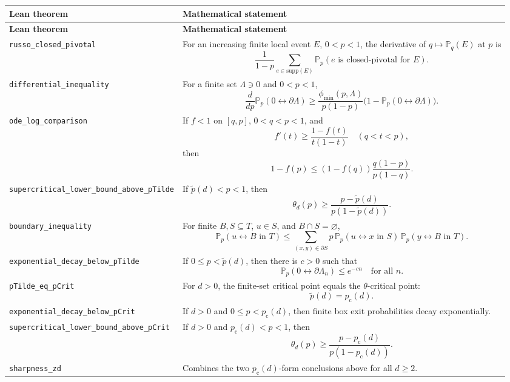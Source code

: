 \documentclass[10pt]{article}
\newcommand{\module}[1]{\texttt{#1}}
\newcommand{\pc}{p_{\mathrm{c}}}
\newcommand{\pt}{\widetilde p}
\newcommand{\prob}{\mathbb P}
\begin{document}
\begin{longtable}{>{\raggedright\arraybackslash}p{} >{\raggedright\arraybackslash}p{}}
\textbf{Lean theorem} & \textbf{Mathematical statement} \\
\hline
\endfirsthead
\textbf{Lean theorem} & \textbf{Mathematical statement} \\
\hline
\endhead
\module{russo\_closed\_pivotal} &
For an increasing finite local event \(E\), \(0<p<1\), the derivative of \(q\mapsto\prob_q(E)\) at \(p\) is
\[
  \frac{1}{1-p}\sum_{e\in\mathrm{supp}(E)}
  \prob_p(e\text{ is closed-pivotal for }E).
\] \\
\module{differential\_inequality} &
For a finite set \(\Lambda\ni0\) and \(0<p<1\),
\[
\frac{d}{dp}\prob_p(0\leftrightarrow \partial\Lambda)
\ge
\frac{\phi_{\min}(p,\Lambda)}{p(1-p)}
\bigl(1-\prob_p(0\leftrightarrow \partial\Lambda)\bigr).
\] \\
\module{ode\_log\_comparison} &
If \(f<1\) on \([q,p]\), \(0<q<p<1\), and
\[
f'(t)\ge \frac{1-f(t)}{t(1-t)}\quad(q<t<p),
\]
then
\[
1-f(p)\le (1-f(q))\frac{q(1-p)}{p(1-q)}.
\] \\
\module{supercritical\_lower\_bound\_above\_pTilde} &
If \(\pt(d)<p<1\), then
\[
\theta_d(p)\ge \frac{p-\pt(d)}{p(1-\pt(d))}.
\] \\
\module{boundary\_inequality} &
For finite \(B,S\subseteq T\), \(u\in S\), and \(B\cap S=\varnothing\),
\[
\prob_p(u\leftrightarrow B\text{ in }T)
\le
\sum_{(x,y)\in\partial S}
p\,\prob_p(u\leftrightarrow x\text{ in }S)\,
\prob_p(y\leftrightarrow B\text{ in }T).
\] \\
\module{exponential\_decay\_below\_pTilde} &
If \(0\le p<\pt(d)\), then there is \(c>0\) such that
\[
\prob_p(0\leftrightarrow \partial\Lambda_n)\le e^{-cn}
\quad\text{for all }n.
\] \\
\module{pTilde\_eq\_pCrit} &
For \(d>0\), the finite-set critical point equals the \(\theta\)-critical point:
\[
\pt(d)=\pc(d).
\] \\
\module{exponential\_decay\_below\_pCrit} &
If \(d>0\) and \(0\le p<\pc(d)\), then finite box exit probabilities decay exponentially. \\
\module{supercritical\_lower\_bound\_above\_pCrit} &
If \(d>0\) and \(\pc(d)<p<1\), then
\[
\theta_d(p)\ge \frac{p-\pc(d)}{p(1-\pc(d))}.
\] \\
\module{sharpness\_zd} &
Combines the two \(\pc(d)\)-form conclusions above for all \(d\ge2\). \\
\end{longtable}
\end{document}
